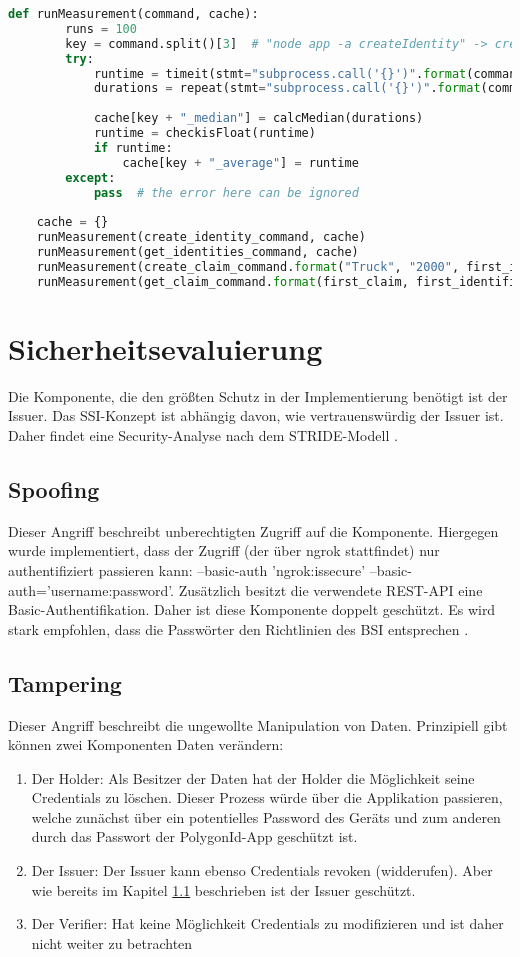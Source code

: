 \begin{lstlisting}[language=python]
	def runMeasurement(command, cache):
		runs = 100
		key = command.split()[3]  # "node app -a createIdentity" -> createIdentity
		try:
			runtime = timeit(stmt="subprocess.call('{}')".format(command), setup="import subprocess", number=runs, )
			durations = repeat(stmt="subprocess.call('{}')".format(command), setup="import subprocess", number=1, repeat=runs)
		
			cache[key + "_median"] = calcMedian(durations)
			runtime = checkisFloat(runtime)
			if runtime:
				cache[key + "_average"] = runtime
		except:
			pass  # the error here can be ignored
			
	cache = {}
	runMeasurement(create_identity_command, cache)
	runMeasurement(get_identities_command, cache)
	runMeasurement(create_claim_command.format("Truck", "2000", first_identifier), cache)
	runMeasurement(get_claim_command.format(first_claim, first_identifier), cache)	
\end{lstlisting}	

\section{Sicherheitsevaluierung}
Die Komponente, die den größten Schutz in der Implementierung benötigt ist der Issuer. Das SSI-Konzept ist abhängig davon, wie vertrauenswürdig der Issuer ist. Daher findet eine Security-Analyse nach dem STRIDE-Modell \cite{ID59}.

\subsection{Spoofing}
\label{Spoofing}
Dieser Angriff beschreibt unberechtigten Zugriff auf die Komponente. Hiergegen wurde implementiert, dass der Zugriff (der über ngrok stattfindet) nur authentifiziert passieren kann: --basic-auth 'ngrok:issecure' --basic-auth='username:password'. Zusätzlich besitzt die verwendete REST-API eine Basic-Authentifikation. Daher ist diese Komponente doppelt geschützt. Es wird stark empfohlen, dass die Passwörter den Richtlinien des BSI entsprechen \cite{ID60}.

\subsection{Tampering}
Dieser Angriff beschreibt die ungewollte Manipulation von Daten. Prinzipiell gibt können zwei Komponenten Daten verändern:
\begin{enumerate}
	\item Der Holder: Als Besitzer der Daten hat der Holder die Möglichkeit seine Credentials zu löschen. Dieser Prozess würde über die Applikation passieren, welche zunächst über ein potentielles Password des Geräts und zum anderen durch das Passwort der PolygonId-App geschützt ist.
	\item Der Issuer: Der Issuer kann ebenso Credentials revoken (widderufen). Aber wie bereits im Kapitel \ref{Spoofing} beschrieben ist der Issuer geschützt.
	\item Der Verifier: Hat keine Möglichkeit Credentials zu modifizieren und ist daher nicht weiter zu betrachten
\end{enumerate}

